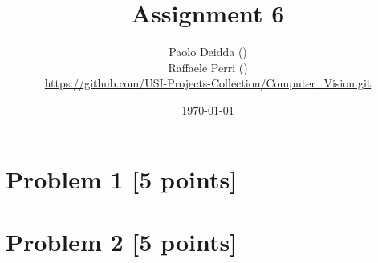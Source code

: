\documentclass[12pt]{article}
\author{
	Paolo Deidda (\text{paolo.deidda@usi.ch}) \\ 
    Raffaele Perri (\text{raffaele.perri@usi.ch}) \\
    \url{https://github.com/USI-Projects-Collection/Computer_Vision.git}
}
\date{\today}
\begin{document}
\title{Assignment 6}
\maketitle

\section*{Problem 1 [5 points]}


\section*{Problem 2 [5 points]}


% 
\end{document}

